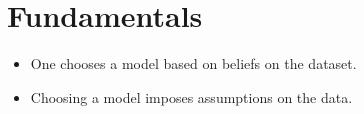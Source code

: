 \section[][customSectionColor]{Fundamentals}


\begin{itemize}
    \item One chooses a model based on beliefs on the dataset.
    \item Choosing a model imposes assumptions on the data.
\end{itemize}